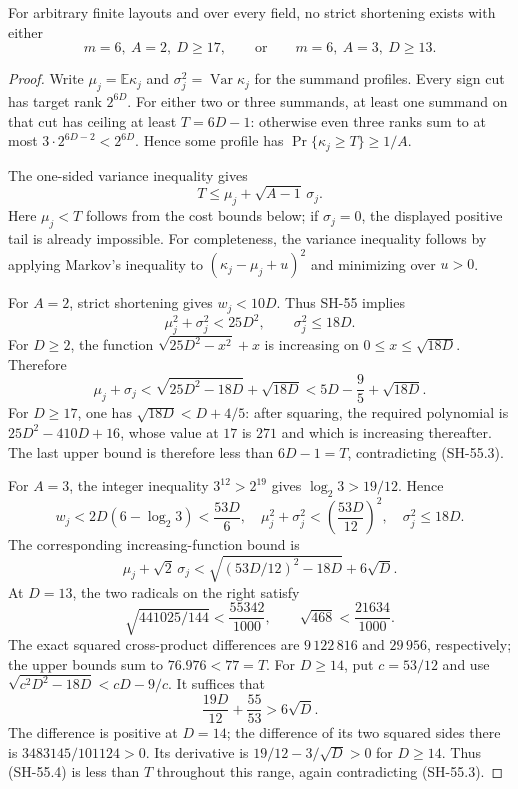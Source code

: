 \begin{theorem}
\label{thm:width-six-moment-bulk}
For arbitrary finite layouts and over every field, no
strict shortening exists with either
\[
 m=6,\ A=2,\ D\geq17,
 \qquad\text{or}\qquad
 m=6,\ A=3,\ D\geq13.
\]
\end{theorem}
\begin{proof}
Write $\mu_j=\mathbb E\kappa_j$ and
$\sigma_j^2=\operatorname{Var}\kappa_j$ for the
summand profiles.  Every sign cut has target rank
$2^{6D}$.  For either two or three summands, at least
one summand on that cut has ceiling at least
$T=6D-1$: otherwise even three ranks sum to at most
$3\cdot2^{6D-2}<2^{6D}$.  Hence some profile has
$\Pr\{\kappa_j\geq T\}\geq1/A$.

The one-sided variance inequality gives
\[
 T\leq\mu_j+\sqrt{A-1}\,\sigma_j.
 \tag{SH-55.3}
\]
Here $\mu_j<T$ follows from the cost bounds below;
if $\sigma_j=0$, the displayed positive tail is already
impossible.  For completeness, the variance inequality
follows by applying Markov's inequality to
$(\kappa_j-\mu_j+u)^2$ and minimizing over $u>0$.

For $A=2$, strict shortening gives $w_j<10D$.
Thus SH-55 implies
\[
 \mu_j^2+\sigma_j^2<25D^2,
 \qquad \sigma_j^2\leq18D.
\]
For $D\geq2$, the function
$\sqrt{25D^2-x^2}+x$ is increasing on
$0\leq x\leq\sqrt{18D}$.  Therefore
\[
 \mu_j+\sigma_j
 <\sqrt{25D^2-18D}+\sqrt{18D}
 <5D-\frac95+\sqrt{18D}.
\]
For $D\geq17$, one has
$\sqrt{18D}<D+4/5$: after squaring, the required
polynomial is $25D^2-410D+16$, whose value at $17$
is $271$ and which is increasing thereafter.
The last upper bound is therefore less than
$6D-1=T$, contradicting (SH-55.3).

For $A=3$, the integer inequality $3^{12}>2^{19}$
gives $\log_2 3>19/12$.  Hence
\[
 w_j<2D(6-\log_2 3)<\frac{53D}{6},
 \quad
 \mu_j^2+\sigma_j^2<\left(\frac{53D}{12}\right)^2,
 \quad \sigma_j^2\leq18D.
\]
The corresponding increasing-function bound is
\[
 \mu_j+\sqrt2\,\sigma_j
 <\sqrt{(53D/12)^2-18D}+6\sqrt D.
 \tag{SH-55.4}
\]
At $D=13$, the two radicals on the right satisfy
\[
 \sqrt{441025/144}<\frac{55342}{1000},
 \qquad
 \sqrt{468}<\frac{21634}{1000}.
\]
The exact squared cross-product differences are
$9\,122\,816$ and $29\,956$, respectively; the
upper bounds sum to $76.976<77=T$.
For $D\geq14$, put $c=53/12$ and use
$\sqrt{c^2D^2-18D}<cD-9/c$.  It suffices that
\[
 \frac{19D}{12}+\frac{55}{53}>6\sqrt D.
\]
The difference is positive at $D=14$; the difference
of its two squared sides there is
$3483145/101124>0$.  Its derivative is
$19/12-3/\sqrt D>0$ for $D\geq14$.
Thus (SH-55.4) is less than $T$ throughout this range,
again contradicting (SH-55.3).
\end{proof}

